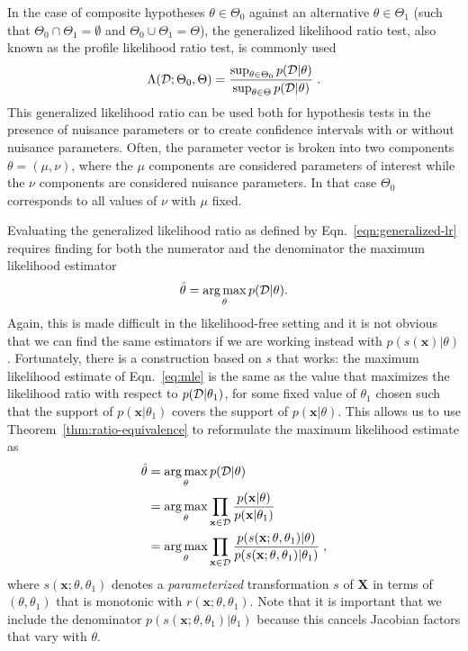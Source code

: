\documentclass[12pt]{article}
\DeclareMathOperator*{\argmax}{arg\,max}
\numberwithin{equation}{section}
\theoremstyle{plain}
\begin{document}

In the case of composite hypotheses $\theta \in \Theta_0$ against an alternative
$\theta \in \Theta_1$ (such that $\Theta_0 \cap \Theta_1 = \emptyset$ and $\Theta_0 \cup \Theta_1 = \Theta$), the
generalized likelihood ratio test, also known as the profile likelihood ratio
test, is commonly used
\begin{equation}\label{eqn:generalized-lr}
\Lambda({\cal D}; \Theta_0, \Theta) =  \frac{ \sup_{\theta \in \Theta_0} p({\cal D} | \theta)}{ \sup_{\theta \in \Theta} p({\cal D} | \theta)} \; .
\end{equation}
This generalized likelihood ratio can be used both for hypothesis tests in the
presence of nuisance parameters or to create confidence intervals with or
without nuisance parameters.  Often, the parameter vector is broken into two
components $\theta=(\mu,\nu)$, where the $\mu$ components are considered
parameters of interest while the $\nu$ components are considered nuisance
parameters. In that case $\Theta_0$ corresponds to all values of $\nu$ with
$\mu$ fixed.

Evaluating the generalized likelihood ratio as defined by
Eqn.~\ref{eqn:generalized-lr} requires finding for both the numerator and the
denominator the maximum likelihood estimator
\begin{equation}\label{eq:mle}
    \hat{\theta} = \argmax_\theta p({\cal D} | \theta).
\end{equation}
Again, this is made difficult in the likelihood-free setting and it is not
obvious that we can find the same estimators if we are working instead with
$p(s(\mathbf{x})|\theta)$. Fortunately, there is a construction
based on $s$ that works: the maximum likelihood estimate of Eqn.~\ref{eq:mle} is
the same as the value that maximizes the likelihood ratio with respect to
$p({\cal D}|\theta_1)$, for some fixed value of $\theta_1$ chosen such that the support of $p(\mathbf{x}|\theta_1)$ covers the support of $p(\mathbf{x}|\theta)$.
This allows us to
use Theorem~\ref{thm:ratio-equivalence} to reformulate the maximum likelihood
estimate as
\begin{align}\label{eq:mle_withs}
\hat{\theta} &= \argmax_\theta  p({\cal D} | \theta) \nonumber \\
&= \argmax_\theta  \prod_{\mathbf{x} \in {\cal D}} \frac{p(\mathbf{x}| \theta)}{p(\mathbf{x}|\theta_1)} \nonumber \\
&= \argmax_\theta  \prod_{\mathbf{x} \in {\cal D}} \frac{p(s(\mathbf{x}; \theta, \theta_1) | \theta)}{p(s(\mathbf{x}; \theta, \theta_1) |\theta_1)} \;,
\end{align}
where $s(\mathbf{x};\theta,\theta_1)$ denotes a \textit{parameterized}
transformation $s$ of $\mathbf{X}$ in terms of $(\theta,\theta_1)$ that is monotonic
with $r(\mathbf{x};\theta,\theta_1)$. Note that it is important that we include
the denominator $p(s(\mathbf{x}; \theta, \theta_1) |\theta_1)$ because this
cancels Jacobian factors that vary with $\theta$.
\end{document}
